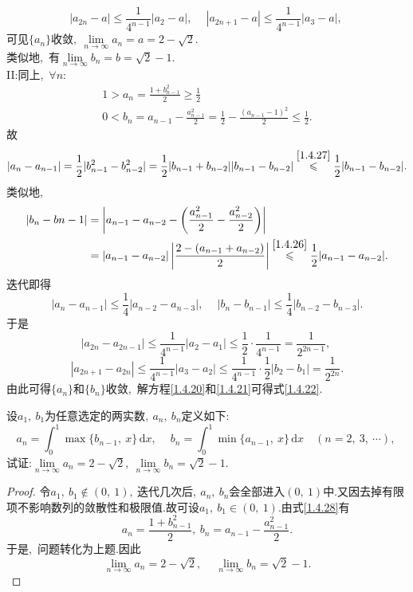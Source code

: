 \begin{solution}
	$$|a_{2n}-a|\leqslant\frac{1}{4^{n-1}}|a_2-a|,\ \quad |a_{2n+1}-a|\leqslant\frac{1}{4^{n-1}}|a_3-a|,\ $$
	可见$\{a_n\}$收敛$,\ \lim\limits_{n\rightarrow\infty}a_n=a=2-\sqrt{2}.$\\
	类似地,\ 有$\lim\limits_{n\rightarrow\infty}b_n=b=\sqrt{2}-1.$\\
	II:同上,\ $\forall n:$
	\begin{align}
		1>a_n=\frac{1+b_{n-1}^2}{2}\geqslant\frac{1}{2}\label{1.4.26}\\
		0<b_n=a_{n-1}-\frac{a_{n-1}^2}{2}=\frac{1}{2}-\frac{(a_{n-1}-1)^2}{2}\leqslant\frac{1}{2}.\label{1.4.27}
	\end{align}
	故
	$$|a_n-a_{n-1}|=\frac{1}{2}|b_{n-1}^2-b_{n-2}^2|=\frac{1}{2}|b_{n-1}+b_{n-2}||b_{n-1}-b_{n-2}|\stackrel{\eqref{1.4.27}}{\leqslant}\frac{1}{2}|b_{n-1}-b_{n-2}|.$$
	类似地,\ 
	$$\begin{aligned}
		|b_n-b{n-1}|&=\left|a_{n-1}-a_{n-2}-\left(\frac{a_{n-1}^2}{2}-\frac{a_{n-2}^2}{2}\right)\right|\\
		&=|a_{n-1}-a_{n-2}|\left|\frac{2-(a_{n-1}+a_{n-2})}{2}\right|\stackrel{\eqref{1.4.26}}{\leqslant}\frac{1}{2}|a_{n-1}-a_{n-2}|.
	\end{aligned}$$
	迭代即得
	$$|a_n-a_{n-1}|\leqslant\frac{1}{4}|a_{n-2}-a_{n-3}|,\ \quad |b_n-b_{n-1}|\leqslant\frac{1}{4}|b_{n-2}-b_{n-3}|.$$
	于是
	$$|a_{2n}-a_{2n-1}|\leqslant\frac{1}{4^{n-1}}|a_2-a_1|\leqslant\frac{1}{2}\cdot\frac{1}{4^{n-1}}=\frac{1}{2^{2n-1}},\ $$
	$$|a_{2n+1}-a_{2n}|\leqslant\frac{1}{4^{n-1}}|a_3-a_2|\leqslant\frac{1}{4^{n-1}}\cdot\frac{1}{2}|b_2-b_1|=\frac{1}{2^{2n}}.$$
	由此可得$\{a_n\}$和$\{b_n\}$收敛,\ 解方程\eqref{1.4.20}和\eqref{1.4.21}可得式\eqref{1.4.22}.
\end{solution}
\newpage
\begin{problem}
	设$a_1,\ b_1$为任意选定的两实数$,\ a_n,\ b_n$定义如下:
	\begin{equation}
		a_n=\int_{0}^{1}\max\{b_{n-1},\ x\}\,\mathrm{d}x,\ \quad b_n=\int_{0}^{1}\min\{a_{n-1},\ x\}\,\mathrm{d}x\quad(n=2,\ 3,\ \cdots),\ \label{1.4.28}
	\end{equation}
	试证:$\lim\limits_{n\rightarrow\infty}a_n=2-\sqrt{2},\ \lim\limits_{n\rightarrow\infty}b_n=\sqrt{2}-1.$
\end{problem}
\begin{proof}
	令$a_1,\ b_1\notin(0,\ 1),\ $迭代几次后$,\ a_n,\ b_n$会全部进入$(0,\ 1)$中.又因去掉有限项不影响数列的敛散性和极限值.故可设$a_1,\ b_1\in(0,\ 1).$由式\eqref{1.4.28}有
	$$a_n=\frac{1+b_{n-1}^2}{2},\ b_n=a_{n-1}-\frac{a_{n-1}^2}{2}.$$
	于是,\ 问题转化为上题.因此
	$$\lim\limits_{n\rightarrow\infty}a_n=2-\sqrt{2},\ \quad\lim\limits_{n\rightarrow\infty}b_n=\sqrt{2}-1.$$
\end{proof}
